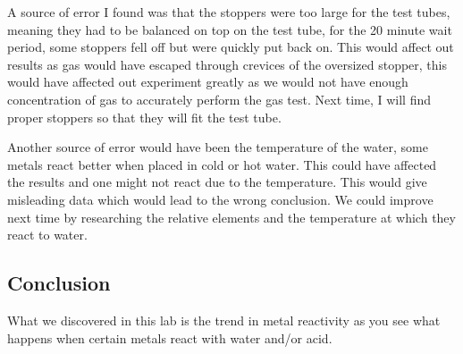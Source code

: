 \documentclass[12pt]{article}
\begin{document}
    A source of error I found was that the stoppers were too large for the test tubes, meaning they had to be balanced on top on the test tube, for the 20 minute wait period, some stoppers fell off but were quickly put back on. This would affect out results as gas would have escaped through crevices of the oversized stopper, this would have affected out experiment greatly as we would not have enough concentration of gas to accurately perform the gas test. Next time, I will find proper stoppers so that they will fit the test tube.

    Another source of error would have been the temperature of the water, some metals react better when placed in cold or hot water. This could have affected the results and one might not react due to the temperature. This would give misleading data which would lead to the wrong conclusion. We could improve next time by researching the relative elements and the temperature at which they react to water.

    \subsection*{Conclusion}

    What we discovered in this lab is the trend in metal reactivity as you see what happens when certain metals react with water and/or acid.
    
\end{document}
